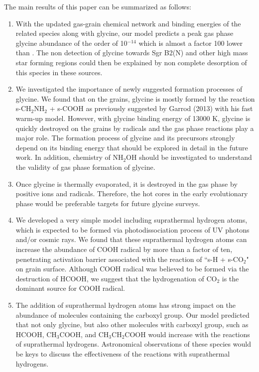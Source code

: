 \documentclass{aastex61}
\begin{document}
The main results of this paper can be summarized as follows:
%

\begin{enumerate}
\item With the updated gas-grain chemical network and binding energies of the related species along with glycine, our model predicts a peak gas phase glycine abundance of the order of 10$^{-14}$ which is almost a factor 100 lower than \cite{Garrod13}. 
%
The non detection of glycine towards Sgr B2(N) and other high mass star forming regions \citep{Kuan03,Snyder05} could then be explained by non complete desorption of this species in these sources.

\item We investigated the importance of newly suggested formation processes of glycine.
%
We found that on the grains, glycine is mostly formed by the reaction s-CH$_2$NH$_2$ + s-COOH as previously suggested by Garrod (2013) with his fast warm-up model. 
%
However, with glycine binding energy of 13000 K, glycine is quickly destroyed on the grains by radicals and the gas phase reactions play a major role.
%
The formation process of glycine and its precursors strongly depend on its binding energy that should be explored in detail in the future work.
%
In addition, chemistry of NH$_2$OH should be investigated to understand the validity of gas phase formation of glycine.

\item Once glycine is thermally evaporated, it is destroyed in the gas phase by positive ions and radicals.
%
Therefore, the hot cores in the early evolutionary phase would be preferable targets for future glycine surveys.
%

\item We developed a very simple model including suprathermal hydrogen atoms, which is expected to be formed via photodissociation process of UV photons and/or cosmic rays.
%
We found that these suprathermal hydrogen atoms can increase the abundance of COOH radical by more than a factor of ten, penetrating activation barrier associated with the reaction of ``s-H + s-CO$_2$" on grain surface.
%
Although COOH radical was believed to be formed via the destruction of HCOOH, we suggest that the hydrogenation of CO$_2$ is the dominant source for COOH radical.

\item The addition of suprathermal hydrogen atoms has strong impact on the abundance of molecules containing the carboxyl group.
%
Our model predicted that not only glycine, but also other molecules with carboxyl group, such as HCOOH, CH$_3$COOH, and CH$_3$CH$_2$COOH would increase with the reactions of suprathermal hydrogens.
%
Astronomical observations of these species would be keys to discuss the effectiveness of the reactions with suprathermal hydrogens.
%
\end{enumerate}
\end{document}
